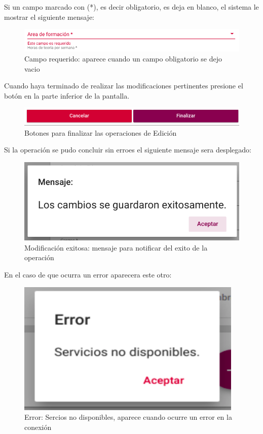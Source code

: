 Si un campo  marcado con (*), es decir obligatorio, es deja en blanco, el sistema le mostrar el siguiente mensaje:\\
\begin{figure}[!hbtp]
    \centering
    \hypertarget{requeridoE}{\includegraphics[width=0.7\linewidth]{images/GUA/requerido}}
    \caption{Campo requerido: aparece cuando un campo obligatorio se dejo vacio}
    \label{requeridoE}
\end{figure}
Cuando haya terminado de realizar las modificaciones pertinentes presione el botón  en la parte inferior de la pantalla.\\
\begin{figure}[!hbtp]
    \centering
    \hypertarget{finalizarBtnE}{\includegraphics[width=0.7\linewidth]{images/GUA/finalizarBtn}}
    \caption{Botones para finalizar las operaciones de Edición}
    \label{finalizarBtnE}
\end{figure}
Si la operación se pudo concluir sin erroes el siguiente mensaje sera desplegado:\\
\begin{figure}[!hbtp]
    \centering
    \hypertarget{modificacion}{\includegraphics[width=0.7\linewidth]{images/GUA/modificacion}}
    \caption{Modificación exitosa: mensaje para notificar del exito de la operación}
    \label{modificacion}
\end{figure}
En el caso de que ocurra un error aparecera este otro:\\
\begin{figure}[!hbtp]
    \centering
    \hypertarget{errorE}{\includegraphics[width=0.7\linewidth]{images/GUA/error}}
    \caption{Error: Sercios no disponibles, aparece cuando ocurre un error en la conexión}
    \label{errorE}
\end{figure}
